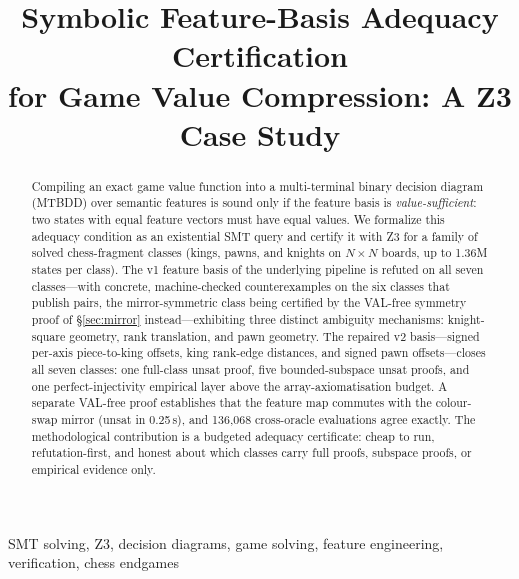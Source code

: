 \documentclass[conference]{IEEEtran}
\begin{document}
\title{Symbolic Feature-Basis Adequacy Certification\\
for Game Value Compression: A Z3 Case Study}

\author{
}

\maketitle

\begin{abstract}
Compiling an exact game value function into a multi-terminal binary decision
diagram (MTBDD) over semantic features is sound only if the feature basis is
\emph{value-sufficient}: two states with equal feature vectors must have
equal values. We formalize this adequacy condition as an existential SMT
query and certify it with Z3 for a family of solved chess-fragment classes
(kings, pawns, and knights on $N\times N$ boards, up to 1.36M states per
class). The v1 feature basis of the underlying pipeline is refuted on all
seven classes---with concrete, machine-checked counterexamples on the six
classes that publish pairs, the mirror-symmetric class being certified by
the VAL-free symmetry proof of \S\ref{sec:mirror} instead---exhibiting
three distinct ambiguity mechanisms: knight-square geometry, rank
translation, and pawn geometry. The repaired v2 basis---signed per-axis
piece-to-king offsets, king rank-edge distances, and signed pawn
offsets---closes all seven classes: one full-class unsat proof, five
bounded-subspace unsat proofs, and one perfect-injectivity empirical layer
above the array-axiomatisation budget. A separate VAL-free proof establishes
that the feature map commutes with the colour-swap mirror (unsat in
0.25\,s), and 136{,}068 cross-oracle evaluations agree exactly. The
methodological contribution is a budgeted adequacy certificate: cheap to
run, refutation-first, and honest about which classes carry full proofs,
subspace proofs, or empirical evidence only.
\end{abstract}

\begin{IEEEkeywords}
SMT solving, Z3, decision diagrams, game solving, feature engineering,
verification, chess endgames
\end{IEEEkeywords}
\end{document}
